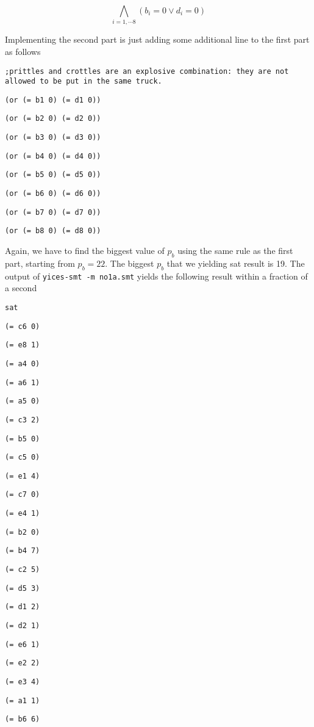 \documentclass[12pt]{article}
\begin{document}
\[ \bigwedge_{i=1,\cdots 8}  (b_i=0 \vee d_i=0)  \]

Implementing the second part is just adding some additional line to the first part as follows

{ \footnotesize
{\tt ;prittles and crottles are an explosive combination: they are not allowed to be put in the same truck. }

{\tt (or (= b1 0) (= d1 0)) }

{\tt (or (= b2 0) (= d2 0)) }

{\tt (or (= b3 0) (= d3 0)) }

{\tt (or (= b4 0) (= d4 0)) }

{\tt (or (= b5 0) (= d5 0)) }

{\tt (or (= b6 0) (= d6 0)) }

{\tt (or (= b7 0) (= d7 0)) }

{\tt (or (= b8 0) (= d8 0)) }

}
Again, we have to find the biggest value of $p_b$ using the same rule as the first part, starting from $p_b=22$. The biggest $p_b$ that we yielding sat result is 19. The output of {\tt yices-smt -m no1a.smt} yields the following result within a fraction of a second


{\tt sat }

{\tt  }

{\tt (= c6 0) }

{\tt (= e8 1) }

{\tt (= a4 0) }

{\tt (= a6 1) }

{\tt (= a5 0) }

{\tt (= c3 2) }

{\tt (= b5 0) }

{\tt (= c5 0) }

{\tt (= e1 4) }

{\tt (= c7 0) }

{\tt (= e4 1) }

{\tt (= b2 0) }

{\tt (= b4 7) }

{\tt (= c2 5) }

{\tt (= d5 3) }

{\tt (= d1 2) }

{\tt (= d2 1) }

{\tt (= e6 1) }

{\tt (= e2 2) }

{\tt (= e3 4) }

{\tt (= a1 1) }

{\tt (= b6 6) }
\end{document}
